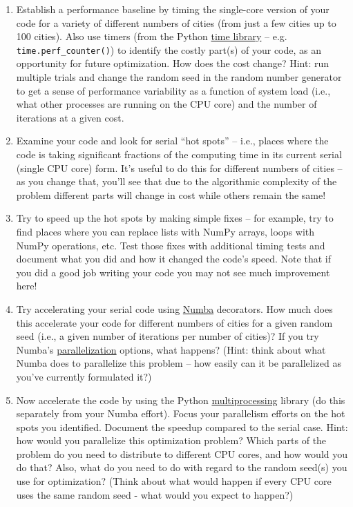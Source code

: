 \documentclass[10pt]{article}
\begin{document}
\begin{enumerate}
  \item Establish a performance baseline by timing the single-core
    version of your code for a variety of different numbers of
    cities (from just a few cities up to 100 cities).  Also use timers
    (from the Python
    \href{https://docs.python.org/3/library/time.html}{time library}
    -- e.g. \texttt{time.perf\_counter()}) to identify the costly part(s) of your
    code, as an opportunity for future optimization. How does the cost
    change?  Hint: run multiple trials and change the random seed in
    the random number generator to get a sense of performance
    variability as a function of system load (i.e., what other
    processes are running on the CPU core) and the number of
    iterations at a given cost.

  \item Examine your code and look for serial ``hot spots'' -- i.e., places
    where the code is taking significant fractions of the computing
    time in its current serial (single CPU core) form.  It's useful to do this for different numbers of cities --
    as you change that, you'll see that due to the algorithmic
    complexity of the problem different parts will change in cost
    while others remain the same!
    
  \item Try to speed up the hot spots by making simple fixes -- for
    example, try to find places where you can replace lists with NumPy
    arrays, loops with NumPy operations, etc. Test those fixes with
    additional timing tests and document what you did and how it
    changed the code's speed. Note that if you did a good job
    writing your code you may not see much improvement here!

  \item Try accelerating your serial code using
    \href{https://numba.pydata.org/}{Numba} decorators.  How much does
    this accelerate your code for different numbers of cities for a
    given random seed (i.e., a given number of iterations per number
    of cities)?  If you try Numba's
    \href{https://numba.readthedocs.io/en/stable/user/parallel.html}{parallelization}
    options, what happens?  (Hint: think about what Numba does to
    parallelize this problem -- how easily can it be parallelized as
    you've currently formulated it?)
   
  \item Now accelerate the code by using the Python
    \href{https://docs.python.org/3/library/multiprocessing.html}{multiprocessing}
    library (do this separately from your Numba effort).  Focus your parallelism efforts on the hot spots you
    identified.  Document the speedup compared to the serial case.
    Hint: how would you parallelize this optimization problem?  Which
    parts of the problem do you need to distribute to different CPU cores, and how would you
    do that?  Also, what do you need to do with regard to the random
    seed(s) you use for optimization?  (Think about what would happen
    if every CPU core uses the same random seed - what would you
    expect to happen?)

  \end{enumerate}
\end{document}
